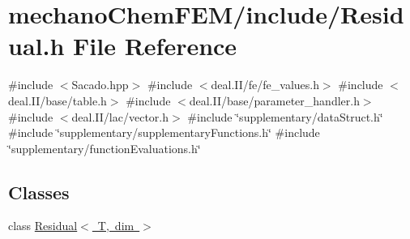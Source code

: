 \section{mechano\+Chem\+F\+E\+M/include/\+Residual.h File Reference}
\label{_residual_8h}
{\ttfamily \#include $<$Sacado.\+hpp$>$}\newline
{\ttfamily \#include $<$deal.\+I\+I/fe/fe\+\_\+values.\+h$>$}\newline
{\ttfamily \#include $<$deal.\+I\+I/base/table.\+h$>$}\newline
{\ttfamily \#include $<$deal.\+I\+I/base/parameter\+\_\+handler.\+h$>$}\newline
{\ttfamily \#include $<$deal.\+I\+I/lac/vector.\+h$>$}\newline
{\ttfamily \#include \char`\"{}supplementary/data\+Struct.\+h\char`\"{}}\newline
{\ttfamily \#include \char`\"{}supplementary/supplementary\+Functions.\+h\char`\"{}}\newline
{\ttfamily \#include \char`\"{}supplementary/function\+Evaluations.\+h\char`\"{}}\newline
\subsection*{Classes}
\begin{DoxyCompactItemize}
\item 
class \mbox{\hyperlink{class_residual}{Residual$<$ T, dim $>$}}
\end{DoxyCompactItemize}
